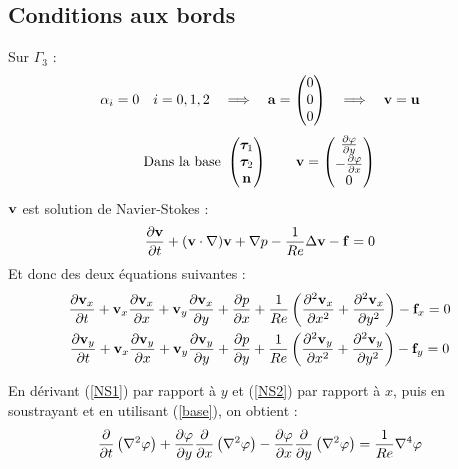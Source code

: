 \documentclass[a4paper,11pt]{article}
\begin{document}
\subsection{Conditions aux bords}
\label{cdtsortie}
Sur $\Gamma_3$ :
\[ \alpha_i=0\quad i=0,1,2\quad \Longrightarrow\quad {\mathbf{a}}=\begin{pmatrix}0\\0\\0\end{pmatrix}\quad \Longrightarrow\quad {\mathbf{v}}={\mathbf{u}} \]
\begin{equation}\label{base}
  \mbox{Dans la base }
  \begin{pmatrix}
    \bm{\tau}_1\\\bm{\tau}_2\\{\mathbf{n}}
  \end{pmatrix}
  \quad\quad {\mathbf{v}}=
  \begin{pmatrix}
    \frac{\partial\varphi}{\partial y}\\-\frac{\partial\varphi}{\partial x}\\0
  \end{pmatrix}
\end{equation}
${\mathbf{v}}$ est solution de Navier-Stokes :
\[ \frac{\partial{\mathbf{v}}}{\partial t} + ({\mathbf{v}}\cdot\nabla){\mathbf{v}} + {\nabla} p - \frac{1}{Re}{\Delta}{\mathbf{v}} - {\mathbf{f}} = 0 \]
Et donc des deux équations suivantes :
\begin{gather}
  \frac{\partial{\mathbf{v}}_x}{\partial t} + {\mathbf{v}}_x\frac{\partial{\mathbf{v}}_x}{\partial x} + {\mathbf{v}}_y\frac{\partial{\mathbf{v}}_x}{\partial y} + \frac{\partial p}{\partial x} + \frac{1}{Re}\left(\frac{\partial^2{\mathbf{v}}_x}{\partial x^2} + \frac{\partial^2{\mathbf{v}}_x}{\partial y^2}\right) - {\mathbf{f}}_x = 0 \label{NS1}\\
  \frac{\partial{\mathbf{v}}_y}{\partial t} + {\mathbf{v}}_x\frac{\partial{\mathbf{v}}_y}{\partial x} + {\mathbf{v}}_y\frac{\partial{\mathbf{v}}_y}{\partial y} + \frac{\partial p}{\partial y} + \frac{1}{Re}\left(\frac{\partial^2{\mathbf{v}}_y}{\partial x^2} + \frac{\partial^2{\mathbf{v}}_y}{\partial y^2}\right) - {\mathbf{f}}_y = 0 \label{NS2}
\end{gather}

En dérivant (\ref{NS1}) par rapport à $y$ et (\ref{NS2}) par rapport à $x$, puis en soustrayant et en utilisant (\ref{base}), on obtient :
\begin{equation}
  \frac{\partial}{\partial t}\left({\nabla}^2\varphi\right) + \frac{\partial\varphi}{\partial y}\frac{\partial}{\partial x}\left({\nabla}^2\varphi\right) - \frac{\partial\varphi}{\partial x}\frac{\partial}{\partial y}\left({\nabla}^2\varphi\right) = \frac{1}{Re}\nabla^4\varphi
\end{equation}
\end{document}
